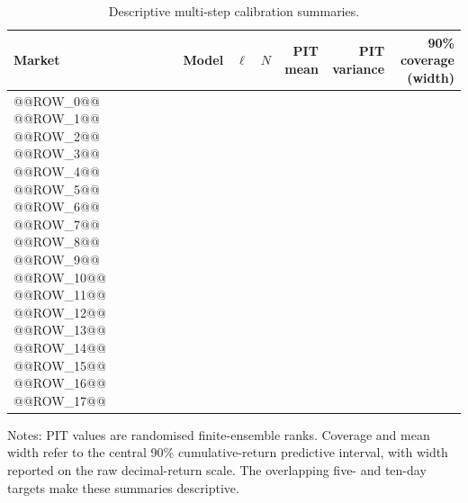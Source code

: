 \begin{table}[htbp]
\centering
\begin{threeparttable}
\caption{Descriptive multi-step calibration summaries.}
\label{tab:multistep-calibration}
\scriptsize
\begin{tabular}{@{}llrrrrr@{}}
\toprule
Market & Model & $\ell$ & $N$ & PIT mean & PIT variance & 90\% coverage (width) \\
\midrule
@@ROW_0@@
@@ROW_1@@
@@ROW_2@@
@@ROW_3@@
@@ROW_4@@
@@ROW_5@@
\addlinespace
@@ROW_6@@
@@ROW_7@@
@@ROW_8@@
@@ROW_9@@
@@ROW_10@@
@@ROW_11@@
\addlinespace
@@ROW_12@@
@@ROW_13@@
@@ROW_14@@
@@ROW_15@@
@@ROW_16@@
@@ROW_17@@
\bottomrule
\end{tabular}
\begin{tablenotes}[flushleft]
\footnotesize
\item Notes: PIT values are randomised finite-ensemble ranks. Coverage and mean width refer to the central 90\% cumulative-return predictive interval, with width reported on the raw decimal-return scale. The overlapping five- and ten-day targets make these summaries descriptive.
\end{tablenotes}
\end{threeparttable}
\end{table}
